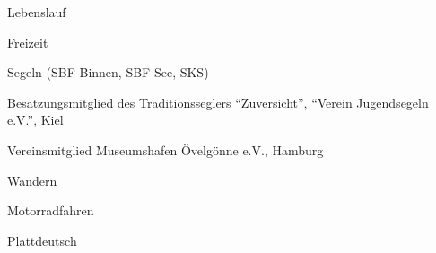\documentclass[11pt,a4paper]{scrartcl}
\begin{document}
\begin{cv}{Lebenslauf}

\begin{cvlist}{Freizeit}
\item Segeln (SBF Binnen, SBF See, SKS)
\item Besatzungsmitglied des Traditionsseglers "`Zuversicht"', "`Verein
Jugendsegeln e.V."', Kiel
\item Vereinsmitglied Museumshafen \"Ovelg\"onne e.V., Hamburg
\item Wandern
\item Motorradfahren
\item Plattdeutsch
\end{cvlist}


\date{26.~Juli~2014}

\end{cv}
\end{document}
